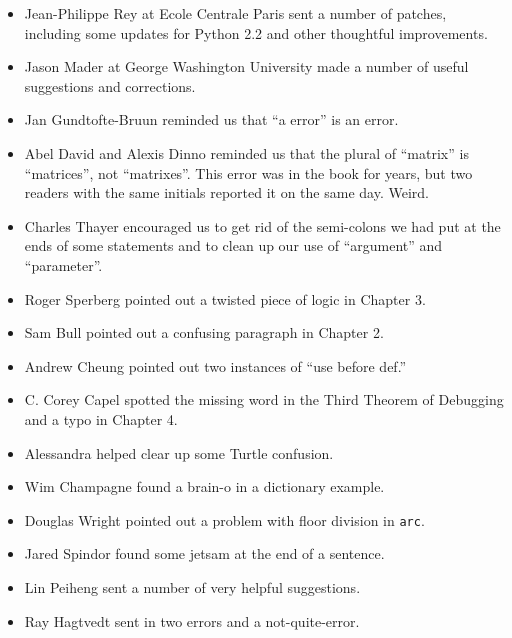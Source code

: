 \documentclass[10pt]{book}
\begin{document}
\begin{CJK}{UTF8}{gbsn}
\begin{itemize}
\item Jean-Philippe Rey at Ecole Centrale
Paris sent a number of patches, including some updates for Python 2.2
and other thoughtful improvements.

\item Jason Mader at George Washington University made a number
of useful suggestions and corrections.

\item Jan Gundtofte-Bruun reminded us that ``a error'' is an error.

\item Abel David and Alexis Dinno reminded us that the plural of
``matrix'' is ``matrices'', not ``matrixes''.  This error was in the
book for years, but two readers with the same initials reported it on
the same day.  Weird.

\item Charles Thayer encouraged us to get rid of the semi-colons
we had put at the ends of some statements and to clean up our
use of ``argument'' and ``parameter''.

\item Roger Sperberg pointed out a twisted piece of logic in Chapter 3.

\item Sam Bull pointed out a confusing paragraph in Chapter 2.

\item Andrew Cheung pointed out two instances of ``use before def.''

\item C. Corey Capel spotted the missing word in the Third Theorem
of Debugging and a typo in Chapter 4.

\item Alessandra helped clear up some Turtle confusion.

\item Wim Champagne found a brain-o in a dictionary example.

\item Douglas Wright pointed out a problem with floor division in
{\tt arc}.

\item Jared Spindor found some jetsam at the end of a sentence.

\item Lin Peiheng sent a number of very helpful suggestions.

\item Ray Hagtvedt sent in two errors and a not-quite-error.


\end{itemize}
\end{CJK}
\end{document}
